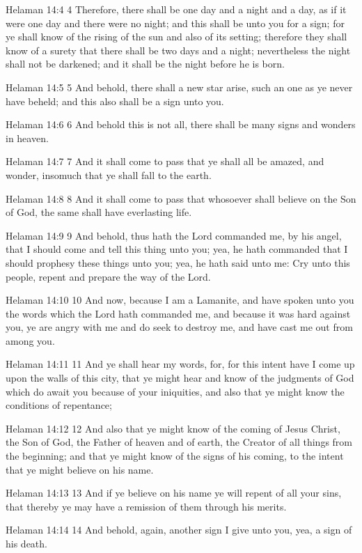Helaman 14:4
 4 Therefore, there shall be one day and a night and a day, as if
it were one day and there were no night; and this shall be unto
you for a sign; for ye shall know of the rising of the sun and
also of its setting; therefore they shall know of a surety that
there shall be two days and a night; nevertheless the night shall
not be darkened; and it shall be the night before he is born.

Helaman 14:5
 5 And behold, there shall a new star arise, such an one as ye
never have beheld; and this also shall be a sign unto you.

Helaman 14:6
 6 And behold this is not all, there shall be many signs and
wonders in heaven.

Helaman 14:7
 7 And it shall come to pass that ye shall all be amazed, and
wonder, insomuch that ye shall fall to the earth.

Helaman 14:8
 8 And it shall come to pass that whosoever shall believe on the
Son of God, the same shall have everlasting life.

Helaman 14:9
 9 And behold, thus hath the Lord commanded me, by his angel,
that I should come and tell this thing unto you; yea, he hath
commanded that I should prophesy these things unto you; yea, he
hath said unto me: Cry unto this people, repent and prepare the
way of the Lord.

Helaman 14:10
 10 And now, because I am a Lamanite, and have spoken unto you
the words which the Lord hath commanded me, and because it was
hard against you, ye are angry with me and do seek to destroy me,
and have cast me out from among you.

Helaman 14:11
 11 And ye shall hear my words, for, for this intent have I come
up upon the walls of this city, that ye might hear and know of
the judgments of God which do await you because of your
iniquities, and also that ye might know the conditions of
repentance;

Helaman 14:12
 12 And also that ye might know of the coming of Jesus Christ,
the Son of God, the Father of heaven and of earth, the Creator of
all things from the beginning; and that ye might know of the
signs of his coming, to the intent that ye might believe on his
name.

Helaman 14:13
 13 And if ye believe on his name ye will repent of all your
sins, that thereby ye may have a remission of them through his
merits.

Helaman 14:14
 14 And behold, again, another sign I give unto you, yea, a sign
of his death.

